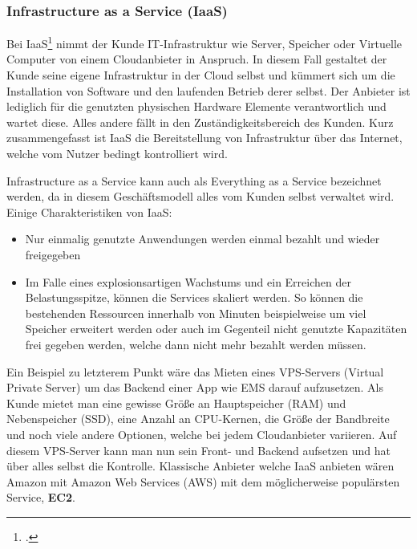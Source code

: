 \subsubsection{Infrastructure as  a Service (IaaS)}
Bei IaaS\footcite{cloud-ms} nimmt der Kunde IT-Infrastruktur wie Server, Speicher oder Virtuelle Computer von einem Cloudanbieter in Anspruch. In diesem Fall gestaltet der Kunde seine eigene Infrastruktur in der Cloud selbst und kümmert sich um die Installation von Software und den laufenden Betrieb derer selbst.
Der Anbieter ist lediglich für die genutzten physischen Hardware Elemente verantwortlich und wartet diese.
Alles andere fällt in den Zuständigkeitsbereich des Kunden. Kurz zusammengefasst ist IaaS die Bereitstellung von Infrastruktur über das Internet, welche vom Nutzer bedingt kontrolliert wird.

Infrastructure as a Service kann auch als Everything as a Service bezeichnet werden, da in diesem Geschäftsmodell alles vom Kunden selbst verwaltet wird. Einige Charakteristiken von IaaS:
\begin{itemize}
	\item Nur einmalig genutzte Anwendungen werden einmal bezahlt und wieder freigegeben
	\item Im Falle eines explosionsartigen Wachstums und ein Erreichen der Belastungsspitze, können die Services skaliert werden. So können die bestehenden Ressourcen innerhalb von Minuten beispielweise um viel Speicher erweitert werden oder auch im Gegenteil nicht genutzte Kapazitäten frei gegeben werden, welche dann nicht mehr bezahlt werden müssen.
\end{itemize}

Ein Beispiel zu letzterem Punkt wäre das Mieten eines VPS-Servers (Virtual Private Server) um das Backend einer App wie EMS darauf aufzusetzen.
Als Kunde mietet man eine gewisse Größe an Hauptspeicher (RAM) und Nebenspeicher (SSD), eine Anzahl an CPU-Kernen, die Größe der 
Bandbreite und noch viele andere Optionen, welche bei jedem Cloudanbieter variieren. 
Auf diesem VPS-Server kann man nun sein Front- und Backend aufsetzen und hat über alles selbst die Kontrolle.
Klassische Anbieter welche IaaS anbieten wären Amazon mit Amazon Web Services (AWS) mit dem möglicherweise populärsten Service, \textbf{EC2}.

